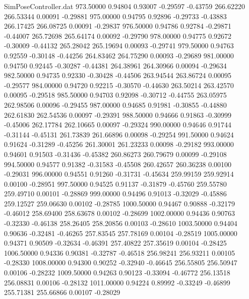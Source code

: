 \begin{filecontents}{SimPoseController.dat}
 973.50000    0.94804    0.93007    -0.29597   -0.43759  266.62220  266.53344    0.00091   -0.29881
 975.00000    0.94795    0.92896    -0.29733   -0.43883  266.17425  266.08725    0.00091   -0.29837
 976.50000    0.94786    0.92784    -0.29871   -0.44007  265.72698  265.64174    0.00092   -0.29790
 978.00000    0.94775    0.92672    -0.30009   -0.44132  265.28042  265.19694    0.00093   -0.29741
 979.50000    0.94763    0.92559    -0.30148   -0.44256  264.83462  264.75290    0.00093   -0.29689
 981.00000    0.94750    0.92445    -0.30287   -0.44381  264.38961  264.30966    0.00094   -0.29634
 982.50000    0.94735    0.92330    -0.30428   -0.44506  263.94544  263.86724    0.00095   -0.29577
 984.00000    0.94720    0.92215    -0.30570   -0.44630  263.50214  263.42570    0.00095   -0.29518
 985.50000    0.94703    0.92098    -0.30712   -0.44755  263.05975  262.98506    0.00096   -0.29455
 987.00000    0.94685    0.91981    -0.30855   -0.44880  262.61830  262.54536    0.00097   -0.29391
 988.50000    0.94666    0.91863    -0.30999   -0.45006  262.17784  262.10665    0.00097   -0.29324
 990.00000    0.94646    0.91744    -0.31144   -0.45131  261.73839  261.66896    0.00098   -0.29254
 991.50000    0.94624    0.91624    -0.31289   -0.45256  261.30001  261.23233    0.00098   -0.29182
 993.00000    0.94601    0.91503    -0.31436   -0.45382  260.86273  260.79679    0.00099   -0.29108
 994.50000    0.94577    0.91382    -0.31583   -0.45508  260.42657  260.36238    0.00100   -0.29031
 996.00000    0.94551    0.91260    -0.31731   -0.45634  259.99159  259.92914    0.00100   -0.28951
 997.50000    0.94525    0.91137    -0.31879   -0.45760  259.55780  259.49710    0.00101   -0.28869
 999.00000    0.94496    0.91013    -0.32029   -0.45886  259.12527  259.06630    0.00102   -0.28785
1000.50000    0.94467    0.90888    -0.32179   -0.46012  258.69400  258.63678    0.00102   -0.28699
1002.00000    0.94436    0.90763    -0.32330   -0.46138  258.26405  258.20856    0.00103   -0.28610
1003.50000    0.94404    0.90636    -0.32481   -0.46265  257.83545  257.78169    0.00104   -0.28519
1005.00000    0.94371    0.90509    -0.32634   -0.46391  257.40822  257.35619    0.00104   -0.28425
1006.50000    0.94336    0.90381    -0.32787   -0.46518  256.98241  256.93211    0.00105   -0.28330
1008.00000    0.94300    0.90252    -0.32940   -0.46645  256.55805  256.50947    0.00106   -0.28232
1009.50000    0.94263    0.90123    -0.33094   -0.46772  256.13518  256.08831    0.00106   -0.28132
1011.00000    0.94224    0.89992    -0.33249   -0.46899  255.71381  255.66866    0.00107   -0.28029

\end{filecontents}
